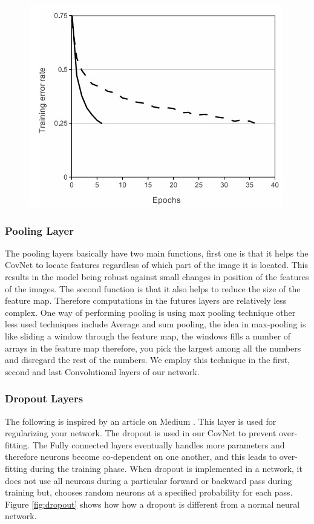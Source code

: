 \documentclass[12pt, a4paper,oneside]{report}
\begin{document}
\begin{figure}
	\includegraphics [scale=0.9] {relu}
	\label{fig:relu}
\end{figure}


\subsubsection{Pooling Layer}
The pooling layers basically have two main functions, first one is that it helps the CovNet to locate features regardless of which part of the image it is located. This results in the model being robust against small changes in position of the features of the images. The second function is that it also helps to reduce the size of the feature map. Therefore computations in the futures layers are relatively less complex. One way of performing pooling is using max pooling technique other less used techniques include Average and sum pooling, the idea in max-pooling is like sliding a window through the feature map, the windows fills a number of arrays in the feature map therefore, you pick the largest among all the numbers and disregard the rest of the numbers. We employ this technique in the first, second and last Convolutional layers of our network.

\subsubsection{Dropout Layers}
The following is inspired by an article on Medium \cite{dropout}. 
This layer is used for regularizing your network. The dropout is used in our CovNet to prevent over-fitting. The Fully connected layers eventually handles more parameters and therefore neurons become co-dependent on one another, and this leads to over-fitting during the training phase. When dropout is implemented in a network, it does not use all neurons during a particular forward or backward pass during training but, chooses random neurons at a specified probability for each pass. Figure \ref{fig:dropout} shows how how a dropout is different from a normal neural network.
\end{document}
